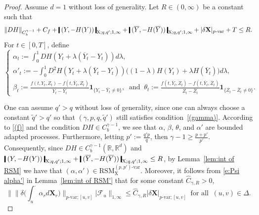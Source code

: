 \documentclass[11pt,reqno]{amsart}
\numberwithin{equation}{section}
\def\R{\mathbb R}
\newcommand{\shortthickbar}{%
  \vcenter{\hbox{\rule{1.8pt}{2.2ex}}}%
}
\newcommand{\thicknm}[1]{%
  \mathopen{\shortthickbar}%
  \mkern4mu #1 \mkern4mu%
  \mathclose{\shortthickbar}%
}
\begin{document}
\begin{proof}
Assume $d=1$ without loss of generality. Let $R \in (0,\infty)$ be a constant such that  
\begin{equation*}
\|DH\|_{C^{\gamma - 1}_b} + C_{f} +  \thicknm{(Y,-H(Y))}_{\mathrm X;q,q';1,\infty} +\thicknm{(\overline Y,-H(\overline Y))}_{\mathrm X;q,q';1,\infty } + |\delta \mathbf X |_{p\text{-}\mathrm{var}} + T \le R.
\end{equation*}For $t\in[0,T]$, define 
\begin{equation*}
\begin{cases}\displaystyle
\alpha_{t} := \int_{0}^{1} DH(Y_t + \lambda(\overline Y_t - Y_t) ) d\lambda,\\ \displaystyle
\alpha'_t := - \int_{0}^{1} D^2 H(Y_{t} + \lambda(\overline Y_t - Y_t) ) \big( (1-\lambda) H(Y_t) + \lambda H(\overline Y_t) \big) d\lambda,\\ \displaystyle
\beta_{t} := \frac{f(t,Y_t,Z_t) - f(t,\overline Y_t,Z_t)}{Y_t - \overline Y_t}\mathbf 1_{\{Y_t - \overline Y_t \neq 0\}},\ \text{ and }\ \theta_{t} := \frac{f(t,\overline Y_t,Z_t) - f(t,\overline Y_t,\overline Z_t)}{Z_t - \overline Z_t}\mathbf 1_{\{Z_t - \overline Z_t \neq 0\}}. 
\end{cases}
\end{equation*}

One can assume $q' > q$ without loss of generality, since one can always choose a constant $\tilde q' > q'$ so that $(\gamma,p,q,\tilde q')$ still satisfies condition~\ref{(gamma)}.
According to \ref{(f)} and the condition $DH\in C^{\gamma - 1}_b$, we see that $\alpha$, $\beta$, $\theta$, and $\alpha'$ are bounded adapted processes. Furthermore, letting $p' := \frac{q'p}{q}$, then $\gamma - 1 \ge \frac{p+p'}{p'}$. Consequently, since $DH \in C^{\gamma - 1}_b(\R,\R^d)$ and $\thicknm{(Y,-H(Y))}_{\mathrm X;q,q';1,\infty} +\thicknm{(\overline Y,-H(\overline Y))}_{\mathrm X;q,q';1,\infty} \le R$, by Lemma~\ref{lem:int of RSM} we have that $(\alpha,\alpha')\in \mathrm{RSM}^{(p,p')\text{-}\mathrm{var}}_{\mathrm X}$. Moreover, it follows from \eqref{e:Psi alpha'} in Lemma~\ref{lem:int of RSM'} that for some constant $\hat C_{\gamma,R} > 0$, 
\begin{equation}\label{e:alpha <= X Psi alpha}
\Big\|\Big\|\delta \Big( \int_{u}^{\bm\cdot}\alpha_{r}d\mathbf X_r \Big) \Big\|_{p\text{-}\mathrm{var};[u,v]}\Big| \mathcal F_u \Big\|_{1,\infty} \le \hat C_{\gamma,R} |\delta \mathbf X|_{p\text{-}\mathrm{var};[u,v]} \ \text{ for all }\ (u,v) \in \Delta.
\end{equation}


\end{proof}
\end{document}
